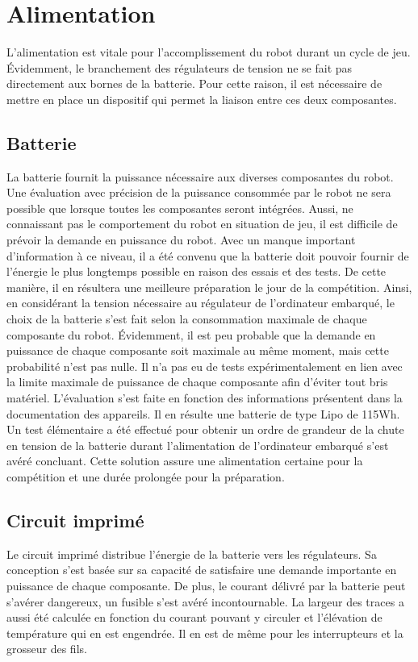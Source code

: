 \section{Alimentation}

L’alimentation est vitale pour l’accomplissement du robot durant un cycle de jeu. Évidemment, le branchement des régulateurs de tension ne se fait pas directement aux bornes de la batterie.
Pour cette raison, il est nécessaire de mettre en place un dispositif qui permet la liaison entre ces deux composantes.

\subsection{Batterie}

La batterie fournit la puissance nécessaire aux diverses composantes du robot. Une évaluation avec précision de la puissance consommée par le robot ne sera possible que lorsque toutes les composantes
seront intégrées. Aussi, ne connaissant pas le comportement du robot en situation de jeu, il est difficile de prévoir la demande en puissance du robot. Avec un manque important d’information à ce niveau,
il a été convenu que la batterie doit pouvoir fournir de l’énergie le plus longtemps possible en raison des essais et des tests. De cette manière, il en résultera une meilleure préparation le jour de la
compétition.  Ainsi, en considérant la tension nécessaire au régulateur de l’ordinateur embarqué, le choix de la batterie s’est fait selon la consommation maximale de chaque composante du robot.
Évidemment, il est peu probable que la demande en puissance de chaque composante soit maximale au même moment, mais cette probabilité n’est pas nulle. Il n’a pas eu de tests expérimentalement en lien avec
la limite maximale de puissance de chaque composante afin d’éviter tout bris matériel. L’évaluation s’est faite en fonction des informations présentent dans la documentation des appareils.
Il en résulte une batterie de type Lipo de 115Wh. Un test élémentaire a été effectué pour obtenir un ordre de grandeur de la chute en tension de la batterie durant l’alimentation de l’ordinateur
embarqué s’est avéré concluant. Cette solution assure une alimentation certaine pour la compétition et une durée prolongée pour la préparation.

\subsection{Circuit imprimé}

Le circuit imprimé distribue l’énergie de la batterie vers les régulateurs. Sa conception s’est basée sur sa capacité de satisfaire une demande importante en puissance de chaque composante.
De plus, le courant délivré par la batterie peut s’avérer dangereux, un fusible s’est avéré incontournable. La largeur des traces a aussi été calculée en fonction du courant pouvant y circuler et
l’élévation de température qui en est engendrée. Il en est de même pour les interrupteurs et la grosseur des fils. 
